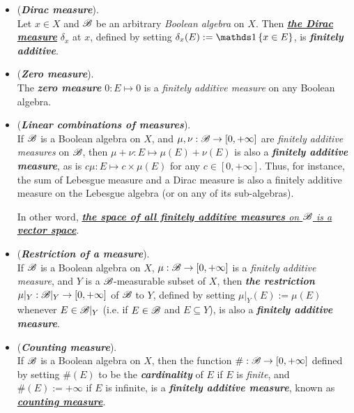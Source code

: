 \documentclass[11pt]{article}
\begin{document}
\begin{itemize}
\item  \begin{example} (\emph{\textbf{Dirac measure}}). \\
Let $x \in X$ and ${\mathscr B}$ be an arbitrary \emph{Boolean algebra} on $X$. Then \underline{\emph{\textbf{the Dirac measure}}} $\delta_x$ at $x$, defined by
setting $\delta_x(E) := \ind{x \in E}$, is \emph{\textbf{finitely additive}}.
\end{example}

\item \begin{example} (\emph{\textbf{Zero measure}}). \\
The \emph{\textbf{zero measure}} $0: E \mapsto 0$ is a \emph{finitely additive measure} on any Boolean algebra.
\end{example}

\item \begin{example} (\emph{\textbf{Linear combinations of measures}}). \\
If ${\mathscr B}$ is a Boolean algebra on $X$, and $\mu, \nu: {\mathscr B} \rightarrow [0, +\infty]$ are \emph{finitely additive measures} on ${\mathscr B}$, then $\mu + \nu: E \mapsto \mu(E)+ \nu(E)$ is also a \emph{\textbf{finitely additive measure}}, as is $c\mu: E \mapsto c \times \mu(E)$ for any $c \in [0, +\infty]$. Thus, for instance, the sum of Lebesgue measure and a Dirac measure is also a finitely additive measure on the Lebesgue algebra (or on any of its sub-algebras).

In other word, \underline{\emph{\textbf{the space of all finitely additive measures} on ${\mathscr B}$ is a \textbf{vector space}}}.
\end{example}

\item \begin{example} (\emph{\textbf{Restriction of a measure}}).\\
If ${\mathscr B}$ is a Boolean algebra on $X$, $\mu: {\mathscr B} \rightarrow [0, +\infty]$ is a \emph{finitely additive measure}, and $Y$ is a ${\mathscr B}$-measurable subset of $X$, then \emph{\textbf{the restriction}} $\mu|_{Y}: {\mathscr B}|_{Y}  \rightarrow [0, +\infty]$ of ${\mathscr B}$ to $Y$, defined by setting $\mu|_{Y}(E) := \mu(E)$ whenever $E \in {\mathscr B}|_{Y}$ (i.e.
if $E \in {\mathscr B}$ and $E \subseteq Y$), is also a \emph{\textbf{finitely additive measure}}.
\end{example}

\item \begin{example} (\emph{\textbf{Counting measure}}).\\
If ${\mathscr B}$ is a Boolean algebra on $X$, then the function $\#: {\mathscr B} \rightarrow [0, +\infty]$ defined by setting $\#(E)$ to be the \emph{\textbf{cardinality}} of $E$ if $E$ is \textit{finite}, and $\#(E) := +\infty$ if $E$ is infinite, is a \emph{\textbf{finitely additive measure}}, known as \underline{\emph{\textbf{counting measure}}}.
\end{example}


\end{itemize}
\end{document}
